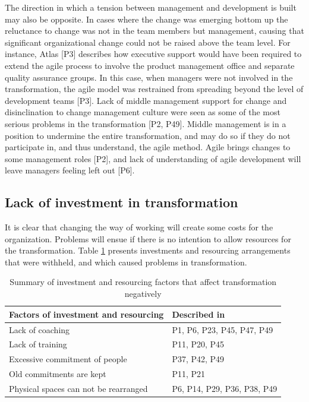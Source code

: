 The direction in which a tension between management and development is built may
also be opposite. In cases where the change was emerging bottom up the
reluctance to change was not in the team members but management, causing that
significant organizational change could not be raised above the team level. For
instance, Atlas [P3] describes how executive support would have been required to
extend the agile process to involve the product management office and separate
quality assurance groups. In this case, when managers %
were not involved in the transformation, the agile model was restrained from
spreading beyond the level of development teams [P3]. Lack of middle management
support for change and disinclination to change management culture were seen as
some of the most serious problems in the transformation [P2, P49]. Middle
management is in a position to undermine the entire transformation, and may do
so if they do not participate in, and thus understand, the agile method. Agile
brings changes to some management roles [P2], and lack of understanding of agile
development will leave managers feeling left out [P6].


\subsection{Lack of investment in transformation}

It is clear that changing the way of working will create some costs for the
organization. Problems will ensue if there is no intention to allow resources
for the transformation. Table \ref{table:challenges_lackofinvestment} presents
investments and resourcing arrangements that were withheld, and which caused
problems in transformation.

\begin{table}[b]
    \centering
    \begin{tabular}{ l l }
        \toprule
        Factors of investment and resourcing  &  Described in \\
        \midrule
        Lack of coaching                      &  P1, P6, P23, P45, P47, P49  \\
        Lack of training                      &  P11, P20, P45  \\
        Excessive commitment of people        &  P37, P42, P49  \\
        Old commitments are kept              &  P11, P21  \\
        Physical spaces can not be rearranged  &  P6, P14, P29, P36, P38, P49  \\
        \bottomrule
    \end{tabular}
    \caption{Summary of investment and resourcing factors that affect
             transformation negatively}
    \label{table:challenges_lackofinvestment}
\end{table}

